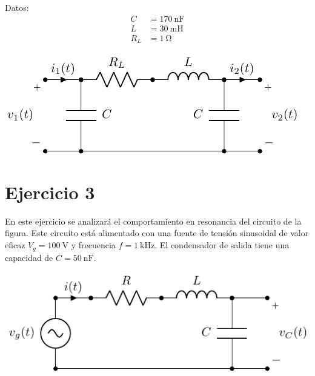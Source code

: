 \documentclass[12pt]{article}
\begin{document}
\begin{minipage}{0.3\textwidth}
Datos:
\begin{align*}
  C &= \SI{170}{\nano\farad}\\
  L &= \SI{30}{\milli\henry}\\
  R_L &= \SI{1}{\ohm}
\end{align*}
\end{minipage}
\begin{minipage}{0.7\textwidth}
  \includegraphics{figs/circuito_respuesta_frecuencia.pdf}
\end{minipage}

\section*{Ejercicio 3}

En este ejercicio se analizará el comportamiento en resonancia del circuito de la figura. Este circuito está alimentado con una fuente de tensión sinusoidal de valor eficaz $V_g = \SI{100}{\volt}$ y frecuencia $f = \SI{1}{\kilo\hertz}$. El condensador de salida tiene una capacidad de $C = \SI{50}{\nano\farad}$.

\begin{center}
  \includegraphics{figs/circuito_resonancia.pdf}
\end{center}
\end{document}
